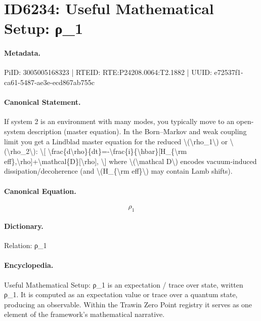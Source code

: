 \section*{ID6234: Useful Mathematical Setup: ρ\_1}
\paragraph{Metadata.}
PiID: 3005005168323 | RTEID: RTE:P24208.0064:T2.1882 | UUID: e72537f1-ca61-5487-ae3e-ecd867ab755c

\paragraph{Canonical Statement.}
If system 2 is an environment with many modes, you typically move to an open-system description (master equation). In the Born–Markov and weak coupling limit you get a Lindblad master equation for the reduced \textbackslash{}(\textbackslash{}rho\_1\textbackslash{}) or \textbackslash{}(\textbackslash{}rho\_2\textbackslash{}): \textbackslash{}[ \textbackslash{}frac\{d\textbackslash{}rho\}\{dt\}=-\textbackslash{}frac\{i\}\{\textbackslash{}hbar\}[H\_\{\textbackslash{}rm eff\},\textbackslash{}rho]+\textbackslash{}mathcal\{D\}[\textbackslash{}rho], \textbackslash{}] where \textbackslash{}(\textbackslash{}mathcal D\textbackslash{}) encodes vacuum-induced dissipation/decoherence (and \textbackslash{}(H\_\{\textbackslash{}rm eff\}\textbackslash{}) may contain Lamb shifts).

\paragraph{Canonical Equation.}
\[
\rho_1
\]

\paragraph{Dictionary.}
Relation: ρ\_1

\paragraph{Encyclopedia.}
Useful Mathematical Setup: ρ\_1 is an expectation / trace over state, written ρ\_1. It is computed as an expectation value or trace over a quantum state, producing an observable. Within the Trawin Zero Point registry it serves as one element of the framework's mathematical narrative.
